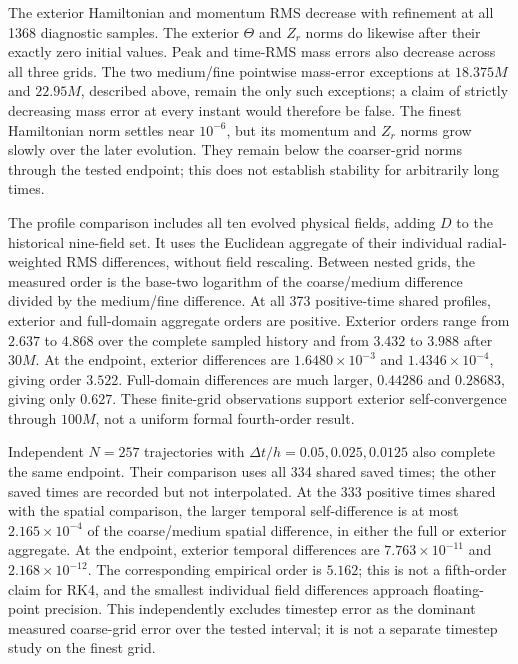 \documentclass[11pt]{article}
\begin{document}
The exterior Hamiltonian and momentum RMS decrease with refinement at all 1368 diagnostic samples. The exterior $\Theta$ and $Z_r$ norms do likewise after their exactly zero initial values. Peak and time-RMS mass errors also decrease across all three grids. The two medium/fine pointwise mass-error exceptions at $18.375M$ and $22.95M$, described above, remain the only such exceptions; a claim of strictly decreasing mass error at every instant would therefore be false. The finest Hamiltonian norm settles near $10^{-6}$, but its momentum and $Z_r$ norms grow slowly over the later evolution. They remain below the coarser-grid norms through the tested endpoint; this does not establish stability for arbitrarily long times.

The profile comparison includes all ten evolved physical fields, adding $D$ to the historical nine-field set. It uses the Euclidean aggregate of their individual radial-weighted RMS differences, without field rescaling. Between nested grids, the measured order is the base-two logarithm of the coarse/medium difference divided by the medium/fine difference. At all 373 positive-time shared profiles, exterior and full-domain aggregate orders are positive. Exterior orders range from $2.637$ to $4.868$ over the complete sampled history and from $3.432$ to $3.988$ after $30M$. At the endpoint, exterior differences are $1.6480\times10^{-3}$ and $1.4346\times10^{-4}$, giving order $3.522$. Full-domain differences are much larger, $0.44286$ and $0.28683$, giving only $0.627$. These finite-grid observations support exterior self-convergence through $100M$, not a uniform formal fourth-order result.

Independent $N=257$ trajectories with $\Delta t/h=0.05,0.025,0.0125$ also complete the same endpoint. Their comparison uses all 334 shared saved times; the other saved times are recorded but not interpolated. At the 333 positive times shared with the spatial comparison, the larger temporal self-difference is at most $2.165\times10^{-4}$ of the coarse/medium spatial difference, in either the full or exterior aggregate. At the endpoint, exterior temporal differences are $7.763\times10^{-11}$ and $2.168\times10^{-12}$. The corresponding empirical order is $5.162$; this is not a fifth-order claim for RK4, and the smallest individual field differences approach floating-point precision. This independently excludes timestep error as the dominant measured coarse-grid error over the tested interval; it is not a separate timestep study on the finest grid.
\end{document}
